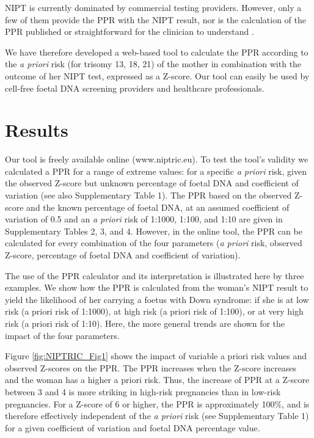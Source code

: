 NIPT is currently dominated by commercial testing providers. 
However, only a few of them provide the PPR with the NIPT result, nor is the calculation of the PPR published or straightforward for the clinician to understand \cite{Benn_2016}.

We have therefore developed a web-based tool to calculate the PPR according to the \textsl{a priori} risk (for trisomy 13, 18, 21) of the mother in combination with the outcome of her NIPT test, expressed as a Z-score. 
Our tool can easily be used by cell-free foetal DNA screening providers and healthcare professionals.

\section{Results}\label{results}
Our tool is freely available online (www.niptric.eu). 
To test the tool’s validity we calculated a PPR for a range of extreme values: for a specific \textsl{a priori} risk, given the observed Z-score but unknown percentage of foetal DNA and coefficient of variation (see also Supplementary Table 1).
The PPR based on the observed Z-score and the known percentage of foetal DNA, at an assumed coefficient of variation of 0.5 and an \textsl{a priori} risk of 1:1000, 1:100, and 1:10 are given in Supplementary Tables 2, 3, and 4. 
However, in the online tool, the PPR can be calculated for every combination of the four parameters (\textsl{a priori} risk, observed Z-score, percentage of foetal DNA and coefficient of variation).

The use of the PPR calculator and its interpretation is illustrated here by three examples. 
We show how the PPR is calculated from the woman’s NIPT result to yield the likelihood of her carrying a foetus with Down syndrome: if she is at low risk (a priori risk of 1:1000), at high risk (a priori risk of 1:100), or at very high risk (a priori risk of 1:10). 
Here, the more general trends are shown for the impact of the four parameters.

Figure \ref{fig:NIPTRIC_Fig1} shows the impact of variable a priori risk values and observed Z-scores on the PPR. 
The PPR increases when the Z-score increases and the woman has a higher a priori risk. Thus, the increase of PPR at a Z-score between 3 and 4 is more striking in high-risk pregnancies than in low-risk pregnancies. 
For a Z-score of 6 or higher, the PPR is approximately 100\%, and is therefore effectively independent of the \textsl{a priori} risk (see Supplementary Table 1) for a given coefficient of variation and foetal DNA percentage value.

